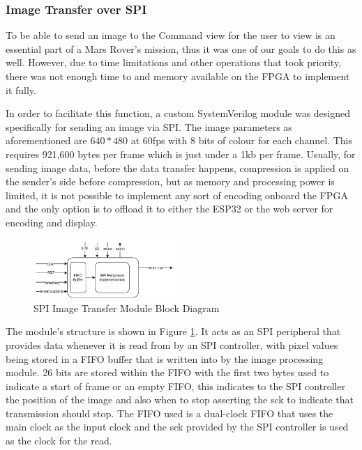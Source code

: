 \documentclass[a4paper]{article}
\begin{document}
\subsubsection{Image Transfer over SPI}

To be able to send an image to the Command view for the user to view is an essential
part of a Mars Rover's mission, thus it was one of our goals to do this as well. However,
due to time limitations and other operations that took priority, there was not enough time
 to and memory available on the FPGA to implement it fully. 

In order to facilitate this function, a custom SystemVerilog module was designed specifically 
for sending an image via SPI. The image parameters as aforementioned are \(640 *480\) at 60fps 
with 8 bits of colour for each channel. This requires 921,600 bytes per frame which is just 
under a 1kb per frame. Usually, for sending image data, before the data transfer happens, 
compression is applied on the sender's side before compression, but as memory and processing
power is limited, it is not possible to implement any sort of encoding onboard the FPGA and the
only option is to offload it to either the ESP32 or the web server for encoding and display. 

\begin{figure}
    \centering
    \includegraphics[width = 0.48\textwidth]{./media/SPI_ImageTransfer.pdf}
    \caption{SPI Image Transfer Module Block Diagram}
    \label{fig:SPIImageTransfer}
\end{figure}

The module's structure is shown in Figure \ref{fig:SPIImageTransfer}. It acts as an SPI peripheral that provides 
data whenever it is read from by an SPI controller, with pixel values being stored in a FIFO 
buffer that is written into by the image processing module. 26 bits are stored within the FIFO
with the first two bytes used to indicate a start of frame or an empty FIFO, this indicates to the 
SPI controller the position of the image and also when to stop asserting the sck to indicate that 
transmission should stop. The FIFO used is a dual-clock FIFO that uses the main clock as the input
clock and the sck provided by the SPI controller is used as the clock for the read.  
\end{document}
